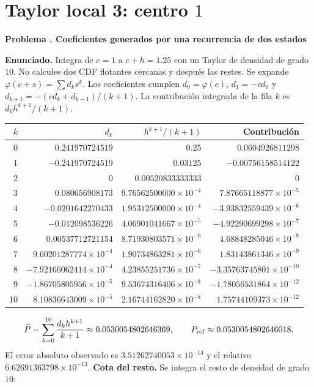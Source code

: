 \documentclass[11pt,a4paper]{article}
\theoremstyle{definition}
\newcounter{problema}
\newenvironment{resuelto}[1]{\refstepcounter{problema}\par\medskip\Needspace{6\baselineskip}\textbf{Problema \theproblema. #1}\par}{\par\medskip}
\begin{document}
\section{\texorpdfstring{Taylor local 3: centro $1$}{Taylor local 3: centro 1}}
\begin{resuelto}{Coeficientes generados por una recurrencia de dos estados}
\textbf{Enunciado.} Integra de $c=1$ a $c+h=1.25$ con un Taylor de densidad de grado 10. No calcules dos CDF flotantes cercanas y después las restes.
Se expande $\varphi(c+s)=\sum d_ks^k$. Los coeficientes cumplen $d_0=\varphi(c)$, $d_1=-cd_0$ y $d_{k+1}=-(cd_k+d_{k-1})/(k+1)$. La contribución integrada de la fila $k$ es $d_kh^{k+1}/(k+1)$.

\begin{center}\small\begin{tabular}{rrrr}
\toprule
$k$&$d_k$&$h^{k+1}/(k+1)$&Contribución\\
\midrule
0&$0.241970724519$&$0.25$&$0.0604926811298$\\
1&$-0.241970724519$&$0.03125$&$-0.00756158514122$\\
2&$0$&$0.00520833333333$&$0$\\
3&$0.080656908173$&$9.76562500000\times10^{-4}$&$7.87665118877\times10^{-5}$\\
4&$-0.0201642270433$&$1.95312500000\times10^{-4}$&$-3.93832559439\times10^{-6}$\\
5&$-0.012098536226$&$4.06901041667\times10^{-5}$&$-4.92290699298\times10^{-7}$\\
6&$0.00537712721154$&$8.71930803571\times10^{-6}$&$4.68848285046\times10^{-8}$\\
7&$9.60201287774\times10^{-4}$&$1.90734863281\times10^{-6}$&$1.83143861346\times10^{-9}$\\
8&$-7.92166062414\times10^{-4}$&$4.23855251736\times10^{-7}$&$-3.35763745801\times10^{-10}$\\
9&$-1.86705805956\times10^{-5}$&$9.53674316406\times10^{-8}$&$-1.78056531864\times10^{-12}$\\
10&$8.10836643009\times10^{-5}$&$2.16744162820\times10^{-8}$&$1.75744109373\times10^{-12}$\\
\bottomrule\end{tabular}\end{center}
\[
\widehat P=\sum_{k=0}^{10}\frac{d_kh^{k+1}}{k+1}\approx0.0530054802646369,\qquad P_{\rm ref}\approx0.0530054802646018.
\]
El error absoluto observado es $3.51262740053\times10^{-14}$ y el relativo $6.62691363798\times10^{-13}$.
\textbf{Cota del resto.} Se integra el resto de densidad de grado $10$:

\end{resuelto}
\end{document}
